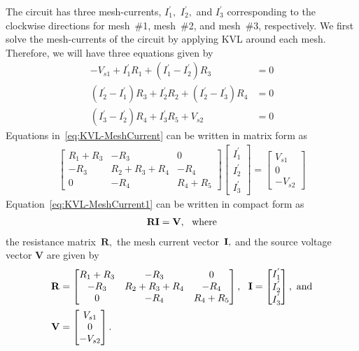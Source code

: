 The circuit has three mesh-currents, $I_1^{'},$ $I_2^{'},$ and $I_3^{'}$ corresponding to the clockwise directions for mesh~\#1, mesh~\#2, and mesh~\#3, respectively. We first solve the mesh-currents of the circuit by applying KVL around each mesh. Therefore, we will have three equations given by %
%
\begin{subequations}
\label{eq:KVL-MeshCurrent}
\begin{align}
  -V_{s1} + I_1^{'}R_1+(I_1^{'}-I_2^{'})R_3 &= 0\\
  (I_2^{'}-I_1^{'})R_3 + I_2^{'}R_2 + (I_2^{'}-I_3^{'})R_4 & = 0\\
  (I_3^{'}-I_2^{'})R_4 + I_3^{'}R_5 + V_{s2} & = 0  
\end{align}  
\end{subequations}
%
Equations in~\eqref{eq:KVL-MeshCurrent} can be written in matrix form as %
%
\begin{align}
  \begin{bmatrix}
    R_1+R_3  & -R_3 & 0\\
    -R_3 & R_2+R_3+R_4 & -R_4\\
    0 & -R_4 & R_4+R_5
  \end{bmatrix}
  \begin{bmatrix}
    I_1^{'}\\
    I_2^{'}\\
    I_3^{'}
  \end{bmatrix}
  =
  \begin{bmatrix}
    V_{s1}\\
    0\\
    -V_{s2}
  \end{bmatrix}
  \label{eq:KVL-MeshCurrent1}
\end{align}
%
Equation~\eqref{eq:KVL-MeshCurrent1} can be written in compact form as %
%
\begin{align}
  {\bf R}{\bf I} = {\bf V},~~\text{where}
  \label{eq:meshCurrent}
\end{align}
%
the resistance matrix~$\mathbf{R},$ the mesh current vector~${\bf I},$ and the source voltage vector $\mathbf{V}$ are given by 
%
\begin{align*}
  {\bf R} &=
  \begin{bmatrix}
    R_1+R_3  & -R_3 & 0\\
    -R_3 & R_2+R_3+R_4 & -R_4\\
    0 & -R_4 & R_4+R_5
  \end{bmatrix}
  ,~~
{\bf I} =
  \begin{bmatrix}
    I_1^{'}\\
    I_2^{'}\\
    I_3^{'}
  \end{bmatrix}
  ,~\text{and}\\
  {\bf V} &=
  \begin{bmatrix}
    V_{s1}\\
    0\\
    -V_{s2}
  \end{bmatrix}.
\end{align*}

